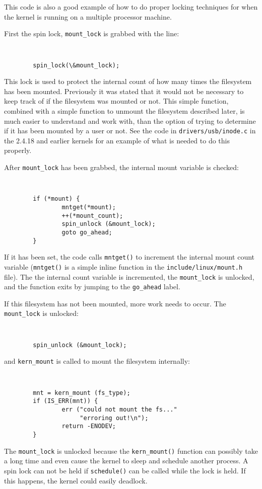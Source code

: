 \documentclass[twocolumn]{article}
\begin{document}
This code is also a good example of how to do proper locking techniques for
when the kernel is running on a multiple processor machine.

First the spin lock, {\tt mount\_lock} is grabbed with the line:
{\tt \small
\begin{verbatim}
        spin_lock(\&mount_lock);
\end{verbatim}
}
This lock is used to protect the internal count of how many times the
filesystem has been mounted.  Previously it was stated that it would not be
necessary to keep track of if the filesystem was mounted or not.  This
simple function, combined with a simple function to unmount the filesystem
described later, is much easier to understand and work with, than the
option of trying to determine if it has been mounted by a user or not.  See
the code in {\tt drivers/usb/inode.c} in the 2.4.18 and earlier kernels
for an example of what is needed to do this properly.

After {\tt mount\_lock} has been grabbed, the internal mount variable is
checked:
{\tt \small
\begin{verbatim}
        if (*mount) {
                mntget(*mount);
                ++(*mount_count);
                spin_unlock (&mount_lock);
                goto go_ahead;
        }
\end{verbatim}
}
If it has been set, the code calls {\tt mntget()} to increment the internal
mount count variable ({\tt mntget()} is a simple inline function in the 
{\tt include/linux/mount.h} file).
The the internal count variable is incremented, the {\tt mount\_lock} is
unlocked, and the function exits by jumping to the {\tt go\_ahead} label.

If this filesystem has not been mounted, more work needs to occur.  The
{\tt mount\_lock} is unlocked:
{\tt \small
\begin{verbatim}
        spin_unlock (&mount_lock);
\end{verbatim}
}
and {\tt kern\_mount} is called to mount the filesystem internally:
{\tt \small
\begin{verbatim}
        mnt = kern_mount (fs_type);
        if (IS_ERR(mnt)) {
                err ("could not mount the fs..."
                     "erroring out!\n");
                return -ENODEV;
        }
\end{verbatim}
}
The {\tt mount\_lock} is unlocked because the {\tt kern\_mount()} function
can possibly take a long time and even cause the kernel to sleep and
schedule another process.  A spin lock can not be held if {\tt schedule()}
can be called while the lock is held.  If this happens, the kernel could
easily deadlock.
\end{document}
